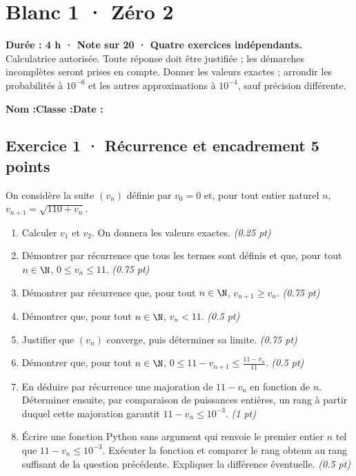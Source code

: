 \fi

\mxnewpage{}\label{sujet:5-2}

\section*{Blanc 1 · Zéro 2}


\textbf{Durée : 4 h · Note sur 20 · Quatre exercices indépendants.}\\Calculatrice autorisée. Toute réponse doit être justifiée ; les démarches incomplètes seront prises en compte. Donner les valeurs exactes ; arrondir les probabilités à $10^{-6}$ et les autres approximations à $10^{-4}$, sauf précision différente.

\smallskip\textbf{Nom :}\enspace\dotfill\quad\textbf{Classe :}\enspace\dotfill\quad\textbf{Date :}\enspace\dotfill

\subsection*{Exercice 1 · Récurrence et encadrement \hfill 5 points}On considère la suite $(v_n)$ définie par $v_0=0$ et, pour tout entier naturel $n$, $v_{n+1}=\sqrt{110+v_n}$.

\begin{enumerate}

\item Calculer $v_1$ et $v_2$. On donnera les valeurs exactes. \hfill\textit{(\num{0,25} pt)}

\item Démontrer par récurrence que tous les termes sont définis et que, pour tout $n\in\N$, $0\le v_n\le11$. \hfill\textit{(\num{0,75} pt)}

\item Démontrer par récurrence que, pour tout $n\in\N$, $v_{n+1}\ge v_n$. \hfill\textit{(\num{0,75} pt)}

\item Démontrer que, pour tout $n\in\N$, $v_n<11$. \hfill\textit{(\num{0,5} pt)}

\item Justifier que $(v_n)$ converge, puis déterminer sa limite. \hfill\textit{(\num{0,75} pt)}

\item Démontrer que, pour tout $n\in\N$, $0\le 11-v_{n+1}\le\frac{11-v_n}{11}$. \hfill\textit{(\num{0,5} pt)}

\item En déduire par récurrence une majoration de $11-v_n$ en fonction de $n$. Déterminer ensuite, par comparaison de puissances entières, un rang à partir duquel cette majoration garantit $11-v_n\le10^{-3}$. \hfill\textit{(1 pt)}

\item Écrire une fonction Python sans argument qui renvoie le premier entier $n$ tel que $11-v_n\le10^{-3}$. Exécuter la fonction et comparer le rang obtenu au rang suffisant de la question précédente. Expliquer la différence éventuelle. \hfill\textit{(\num{0,5} pt)}

\end{enumerate}

